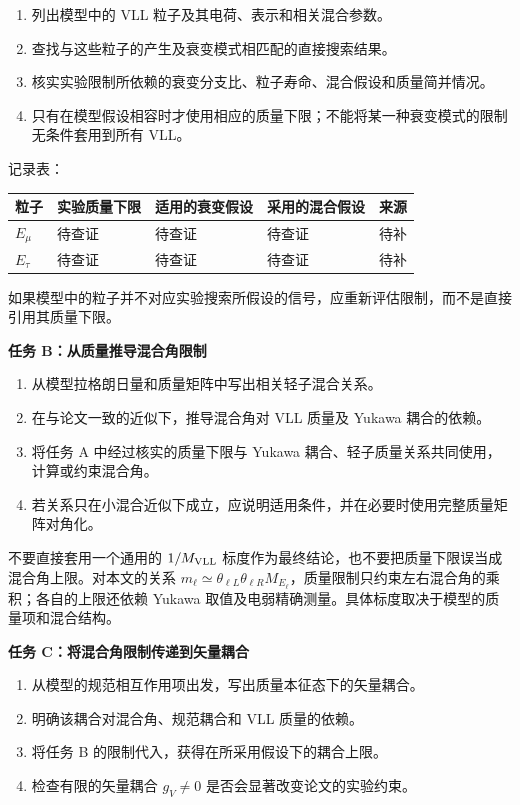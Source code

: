 \documentclass[
  chinese,
  UTF8]{ctexart}
\newcounter{none} %
\providecommand{\tightlist}{%
  \setlength{\itemsep}{0pt}\setlength{\parskip}{0pt}}
\begin{document}
\begin{enumerate}
\def\labelenumi{\arabic{enumi}.}
\tightlist
\item
  列出模型中的 VLL 粒子及其电荷、表示和相关混合参数。
\item
  查找与这些粒子的产生及衰变模式相匹配的直接搜索结果。
\item
  核实实验限制所依赖的衰变分支比、粒子寿命、混合假设和质量简并情况。
\item
  只有在模型假设相容时才使用相应的质量下限；不能将某一种衰变模式的限制无条件套用到所有
  VLL。
\end{enumerate}

记录表：

{\def\LTcaptype{none} %
\begin{longtable}[]{@{}lllll@{}}
\toprule\noalign{}
粒子 & 实验质量下限 & 适用的衰变假设 & 采用的混合假设 & 来源 \\
\midrule\noalign{}
\endhead
\bottomrule\noalign{}
\endlastfoot
\(E_\mu\) & 待查证 & 待查证 & 待查证 & 待补 \\
\(E_\tau\) & 待查证 & 待查证 & 待查证 & 待补 \\
\end{longtable}
}

如果模型中的粒子并不对应实验搜索所假设的信号，应重新评估限制，而不是直接引用其质量下限。

\textbf{任务 B：从质量推导混合角限制}

\begin{enumerate}
\def\labelenumi{\arabic{enumi}.}
\tightlist
\item
  从模型拉格朗日量和质量矩阵中写出相关轻子混合关系。
\item
  在与论文一致的近似下，推导混合角对 VLL 质量及 Yukawa 耦合的依赖。
\item
  将任务 A 中经过核实的质量下限与 Yukawa
  耦合、轻子质量关系共同使用，计算或约束混合角。
\item
  若关系只在小混合近似下成立，应说明适用条件，并在必要时使用完整质量矩阵对角化。
\end{enumerate}

不要直接套用一个通用的 \(1/M_{\rm VLL}\)
标度作为最终结论，也不要把质量下限误当成混合角上限。对本文的关系
\(m_\ell\simeq\theta_{\ell L}\theta_{\ell R}M_{E_\ell}\)，质量限制只约束左右混合角的乘积；各自的上限还依赖
Yukawa 取值及电弱精确测量。具体标度取决于模型的质量项和混合结构。

\textbf{任务 C：将混合角限制传递到矢量耦合}

\begin{enumerate}
\def\labelenumi{\arabic{enumi}.}
\tightlist
\item
  从模型的规范相互作用项出发，写出质量本征态下的矢量耦合。
\item
  明确该耦合对混合角、规范耦合和 VLL 质量的依赖。
\item
  将任务 B 的限制代入，获得在所采用假设下的耦合上限。
\item
  检查有限的矢量耦合 \(g_V\neq 0\) 是否会显著改变论文的实验约束。
\end{enumerate}
\end{document}
